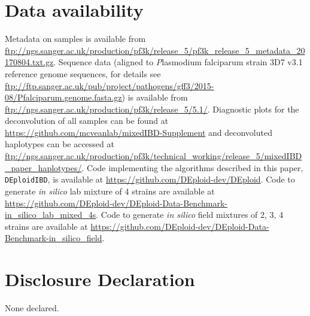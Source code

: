 \documentclass[9pt,lineno]{elife}
\begin{document}
\section{Data availability}
Metadata on samples is available from \url{ftp://ngs.sanger.ac.uk/production/pf3k/release_5/pf3k_release_5_metadata_20170804.txt.gz}.  Sequence data (aligned to {\emph Plasmodium falciparum} strain 3D7 v3.1 reference genome sequences, for details see \url{      ftp://ftp.sanger.ac.uk/pub/project/pathogens/gff3/2015-08/Pfalciparum.genome.fasta.gz}) is available from  \url{ftp://ngs.sanger.ac.uk/production/pf3k/release_5/5.1/}.  Diagnostic plots for the deconvolution of all samples can be found at \url{https://github.com/mcveanlab/mixedIBD-Supplement} and deconvoluted haplotypes can be accessed at \url{ftp://ngs.sanger.ac.uk/production/pf3k/technical_working/release_5/mixedIBD_paper_haplotypes/}. Code implementing the algorithms described in this paper, \texttt{DEploidIBD}, is available at \url{https://github.com/DEploid-dev/DEploid}. Code to generate {\it in silico} lab mixture of 4 strains are available at \url{https://github.com/DEploid-dev/DEploid-Data-Benchmark-in_silico_lab_mixed_4s}. Code to generate {\it in silico} field mixtures of 2, 3, 4 strains are available at \url{https://github.com/DEploid-dev/DEploid-Data-Benchmark-in_silico_field}.



\section{Disclosure Declaration}
None declared.



\end{document}
